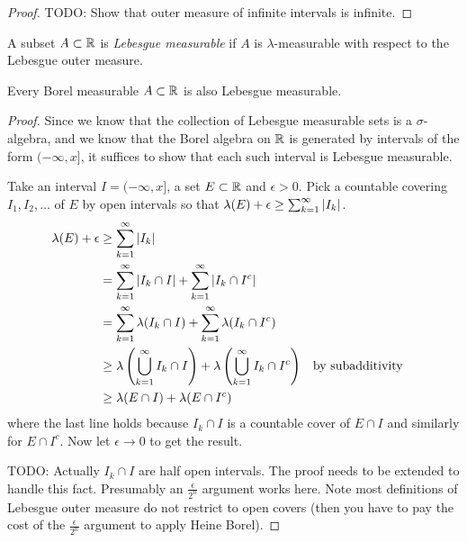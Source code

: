 \begin{proof}
TODO: Show that outer measure of infinite intervals is infinite.
\end{proof}

\begin{defn}A subset $A \subset \mathbb{R}$ is \emph{Lebesgue measurable}
  if $A$ is $\lambda$-measurable with respect to the Lebesgue outer measure.
\end{defn}

\begin{lem}\label{BorelsAreLebesgueMeasurable}Every Borel measurable $A \subset \mathbb{R}$ is also Lebesgue measurable.
\end{lem}
\begin{proof}Since we know that the collection of Lebesgue measurable
  sets is a $\sigma$-algebra, and we know that the Borel algebra on
  $\mathbb{R}$ is generated by intervals of the form $(-\infty, x]$, it
  suffices to show that each such interval is Lebesgue measurable.

Take an interval $I=(-\infty, x]$, a set $E \subset \mathbb{R}$ and
$\epsilon > 0$.  Pick a countable covering $I_1, I_2, \dots$ of $E$ by
open intervals so that
$\lambda(E) + \epsilon \geq \sum_{k=1}^\infty \left \vert I_k \right \vert $.
\begin{align*}
\lambda(E) + \epsilon &\geq \sum_{k=1}^\infty \left \vert I_k \right \vert \\
&=\sum_{k=1}^\infty \left \vert I_k \cap I \right \vert  + \sum_{k=1}^\infty \left \vert I_k \cap I^c \right \vert \\
&=\sum_{k=1}^\infty \lambda(I_k \cap I) + \sum_{k=1}^\infty
\lambda(I_k \cap I^c) \\
&\geq \lambda \left ( \bigcup_{k=1}^\infty I_k \cap I \right )
+\lambda \left ( \bigcup_{k=1}^\infty I_k \cap I^c \right ) &
&\text{by subadditivity} \\
&\geq \lambda(E \cap I) + \lambda(E \cap I^c)
\end{align*}
where the last line holds because $I_k \cap I$ is a countable cover of
$E \cap I$ and similarly for $E \cap I^c$.  Now let $\epsilon \to 0$
to get the result.

TODO: Actually $I_k \cap I$ are half open intervals.  The proof needs
to be extended 
to handle this fact.  Presumably an $\frac{\epsilon}{2^n}$ argument
works here.  Note most definitions of Lebesgue outer measure do not
restrict to open covers (then you have to pay the cost of the
$\frac{\epsilon}{2^n}$ argument to apply Heine Borel).
\end{proof}

